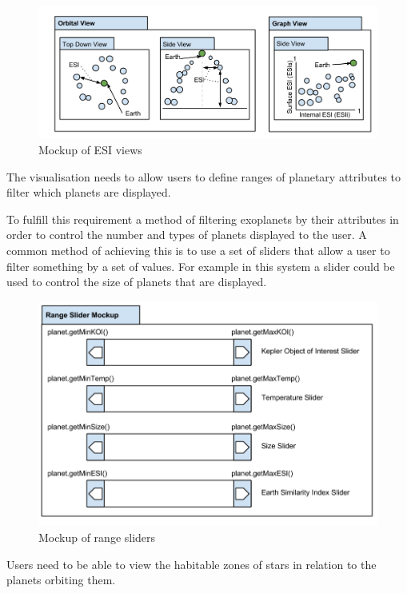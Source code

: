 \begin{enumerate}
\begin{figure}[h!]
  \centering
      \includegraphics[width=1\textwidth]{images/mockupESI.png}
  \caption{Mockup of ESI views}  
\end{figure}


{\bf
 \item[R4.] The visualisation needs to allow users to define ranges of planetary
attributes to filter which planets are displayed.}

To fulfill this requirement a method of filtering exoplanets by their attributes
in order to control the number and types of planets displayed to the user. A
common method of achieving this is to use a set of sliders that allow a user to
filter something by a set of values. For example in this system a slider could
be used to control the size of planets that are displayed.

\begin{figure}[h!]
  \centering
      \includegraphics[width=.8\textwidth]{images/mockSlider.png}
  \caption{Mockup of range sliders}  
\end{figure}



{\bf
 \item[R5.] Users need to be able to view the habitable zones of stars in relation to the planets orbiting them.}


\end{enumerate}
